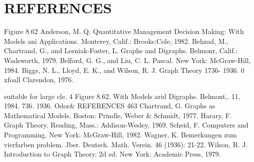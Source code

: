 \documentclass{article}
\begin{document}
\section{REFERENCES} 
Figure 8.62 
Anderson, M. Q. Quantitative Management Decision Making: With Models ani Applications. Monterey, Calif.: Brooks:Cole, 1982. Behzad, M., Chartrand, G., and Lesniak-Foster, L. Graphs and Digraphs. Belmonr, Calif.: Wadsworth, 1979. Belford, G. G., and Liu, C. L. Pascal. New York: McGraw-Hill, 1984. Biggs, N. L., Lloyd, E. K., and Wilson, R. J. Graph Theory 1736- 1936. 0 xfoall Clarendon, 1976. 




suitable for large 
cle. 4 Figure 8.62. 
With Models arid Digraphs. Belmont,. 11, 1984. 736. 1936. Odor& 
REFERENCES 463 Chartrand, G. Graphs as Mathematical Models. Boston: Prindle, Weber & Schmidt, 1977. Harary, F. Graph Theory. Reading, Mass.: Addison-Wesley, 1969. Scheid, F. Computers and Programming. New York: McGraw-Hill, 1982. Wagner, K. Bemerkungen zum vierfarben problem. Jber. Deutsch. Math. Verein. 46 (1936): 21-22. Wilson, R. J. Introduction to Graph Theory. 2d ed. New York: Academic Press, 1979. 
\end{document}
